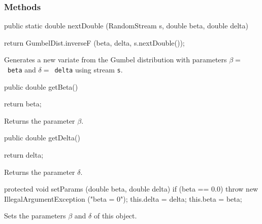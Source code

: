 \subsubsection* {Methods}
\begin{code}

   public static double nextDouble (RandomStream s, double beta, double delta)\begin{hide} {
      return GumbelDist.inverseF (beta, delta, s.nextDouble());
   }\end{hide}
\end{code}
\begin{tabb}
   Generates a new variate from the Gumbel distribution with parameters
   $\beta = $~\texttt{beta} and $\delta = $~\texttt{delta} using stream \texttt{s}.
\end{tabb}
\begin{code}

   public double getBeta()\begin{hide} {
      return beta;
   }\end{hide}
\end{code}
  \begin{tabb} Returns the parameter $\beta$.
  \end{tabb}
\begin{code}

   public double getDelta()\begin{hide} {
      return delta;
   }\end{hide}
\end{code}
  \begin{tabb} Returns the parameter $\delta$.
  \end{tabb}
\begin{hide}\begin{code}

   protected void setParams (double beta, double delta) {
     if (beta == 0.0)
         throw new IllegalArgumentException ("beta = 0");
      this.delta = delta;
      this.beta = beta;
   }
\end{code}
\begin{tabb}
   Sets the parameters  $\beta$  and $\delta$ of this object.
\end{tabb}
\begin{code}
}
\end{code}
\end{hide}
